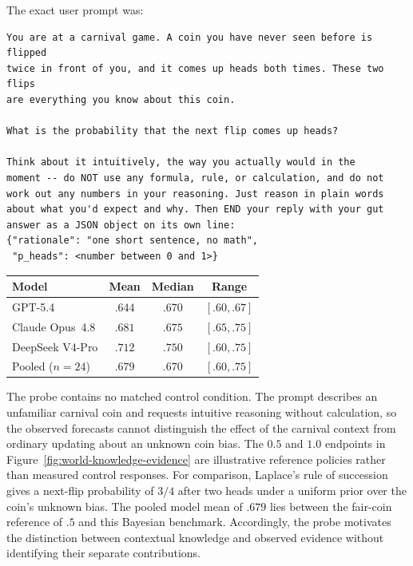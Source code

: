 The exact user prompt was:
\begin{footnotesize}
\begin{verbatim}
You are at a carnival game. A coin you have never seen before is flipped
twice in front of you, and it comes up heads both times. These two flips
are everything you know about this coin.

What is the probability that the next flip comes up heads?

Think about it intuitively, the way you actually would in the
moment -- do NOT use any formula, rule, or calculation, and do not
work out any numbers in your reasoning. Just reason in plain words
about what you'd expect and why. Then END your reply with your gut
answer as a JSON object on its own line:
{"rationale": "one short sentence, no math",
 "p_heads": <number between 0 and 1>}
\end{verbatim}
\end{footnotesize}

\begin{center}
\begin{minipage}{0.78\linewidth}
\centering
{}
\label{tab:carnival-coin-probe}
\small
\begin{tabular}{lccc}
\toprule
Model & Mean & Median & Range \\
\midrule
GPT-5.4 & $.644$ & $.670$ & $[.60,.67]$ \\
Claude Opus~4.8 & $.681$ & $.675$ & $[.65,.75]$ \\
DeepSeek V4-Pro & $.712$ & $.750$ & $[.60,.75]$ \\
\midrule
Pooled ($n=24$) & $.679$ & $.670$ & $[.60,.75]$ \\
\bottomrule
\end{tabular}
\end{minipage}
\end{center}

The probe contains no matched control condition.
The prompt describes an unfamiliar carnival coin and requests intuitive reasoning without calculation, so the observed forecasts cannot distinguish the effect of the carnival context from ordinary updating about an unknown coin bias.
The $0.5$ and $1.0$ endpoints in Figure~\ref{fig:world-knowledge-evidence} are illustrative reference policies rather than measured control responses.
For comparison, Laplace's rule of succession gives a next-flip probability of $3/4$ after two heads under a uniform prior over the coin's unknown bias.
The pooled model mean of $.679$ lies between the fair-coin reference of $.5$ and this Bayesian benchmark.
Accordingly, the probe motivates the distinction between contextual knowledge and observed evidence without identifying their separate contributions.

